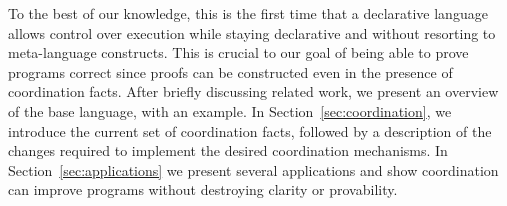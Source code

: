 To the best of our knowledge, this is the first time that a declarative language allows 
control over execution while staying declarative and without resorting to
meta-language constructs. This is crucial to our goal of being able to prove
programs correct since
proofs can be constructed even in the presence of coordination facts.
After briefly discussing related work, we present an overview of the base
language, with an example. In Section~\ref{sec:coordination}, we introduce the
current set of coordination facts,
followed by a description of the changes required to implement the desired
coordination mechanisms. In
Section~\ref{sec:applications} we present several applications and show
coordination can improve programs without destroying clarity or provability.
